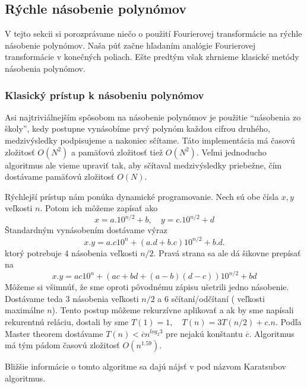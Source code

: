 \subsection{Rýchle násobenie polynómov}

V tejto sekcii si porozprávame niečo o použití Fourierovej
transformácie na rýchle násobenie polynómov. Naša púť začne hľadaním
analógie Fourierovej transformácie v konečných poliach. Ešte predtým
však zhrnieme klasické metódy násobenia polynómov.

\subsubsection{Klasický prístup k násobeniu polynómov}
Asi najtriviálnejším spôsobom na násobenie polynómov je použitie
``násobenia zo školy'', kedy postupne vynásobíme prvý polynóm
každou cifrou druhého, medzivýsledky podpisujeme a nakoniec sčítame.
Táto implementácia má časovú zložitosť $O(N^2)$ a pamäťovú zložitosť
tiež $O(N^2)$. Veľmi jednoducho algoritmus ale vieme upraviť tak,
aby sčítaval medzivýsledky priebežne, čím dostávame pamäťovú zložitosť
$O(N)$.

Rýchlejší prístup nám ponúka dynamické programovanie. Nech sú obe
čísla $x,y$ veľkosti $n$. Potom ich môžeme zapísať ako
\begin{equation*}
x= a. 10^{n/2} + b, \quad y=c. 10^{n/2} + d
\end{equation*}
Štandardným vynásobením dostávame výraz
\begin{equation*}
x.y = a.c 10^n + (a.d+b.c) 10^{n/2} + b.d.
\end{equation*}
ktorý potrebuje 4 násobenia veľkosti $n/2$.
Pravá strana sa ale dá šikovne prepísať na 
\begin{equation*}
x.y = ac 10^n + (ac + bd + (a-b)(d-c)) 10^{n/2} + bd
\end{equation*}
Môžeme si všimnúť, že sme oproti pôvodnému zápisu ušetrili jedno násobenie.
Dostávame teda 3 násobenia veľkosti $n/2$ a 6 sčítaní/odčítaní (
veľkosti maximálne $n$).
Tento postup môžeme rekurzívne aplikovať a ak by sme napísali
rekurentnú reláciu, dostali by sme $T(1)=1, \quad T(n)=3 T(n/2) +
c.n$. Podľa Master theorem \cite[p. 73-90]{Introduction} dostávame
$T(n) < \overline{c} n^{log_2 3}$ pre nejakú konštantu $\overline{c}$. 
Algoritmus má tým pádom časovú zložitosť $O(n^{1.59})$.

\begin{poznamka}
Bližšie informácie o tomto algoritme sa dajú nájsť v
 \cite[p. 118-119]{CompAlg} pod názvom Karatsubov algoritmus.
\end{poznamka}

